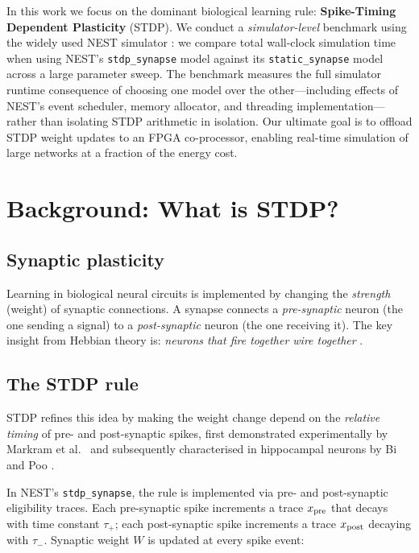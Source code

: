 \documentclass[10pt,twocolumn]{article}
\begin{document}
In this work we focus on the dominant biological learning rule:
\textbf{Spike-Timing Dependent Plasticity} (STDP).
We conduct a \emph{simulator-level} benchmark using the widely
used NEST simulator \cite{gewaltig2007}: we compare total wall-clock
simulation time when using NEST's \texttt{stdp\_synapse} model
against its \texttt{static\_synapse} model across a large parameter
sweep.
The benchmark measures the full simulator runtime consequence of
choosing one model over the other---including effects of NEST's
event scheduler, memory allocator, and threading
implementation---rather than isolating STDP arithmetic in isolation.
Our ultimate goal is to offload STDP weight updates to an
FPGA co-processor, enabling real-time simulation of large networks
at a fraction of the energy cost.

\section{Background: What is STDP?}
\label{sec:stdp}

\subsection{Synaptic plasticity}

Learning in biological neural circuits is implemented by changing
the \emph{strength} (weight) of synaptic connections.
A synapse connects a \emph{pre-synaptic} neuron
(the one sending a signal) to a \emph{post-synaptic} neuron
(the one receiving it).
The key insight from Hebbian theory is:
\emph{neurons that fire together wire together} \cite{hebb1949}.

\subsection{The STDP rule}

STDP refines this idea by making the weight change depend on the
\emph{relative timing} of pre- and post-synaptic spikes, first
demonstrated experimentally by Markram et al.\ \cite{markram1997}
and subsequently characterised in hippocampal neurons by
Bi and Poo \cite{bi1998}.

In NEST's \texttt{stdp\_synapse}, the rule is implemented via
pre- and post-synaptic eligibility traces.
Each pre-synaptic spike increments a trace $x_{\rm pre}$ that
decays with time constant $\tau_+$; each post-synaptic spike
increments a trace $x_{\rm post}$ decaying with $\tau_-$.
Synaptic weight $W$ is updated at every spike event:
\end{document}
